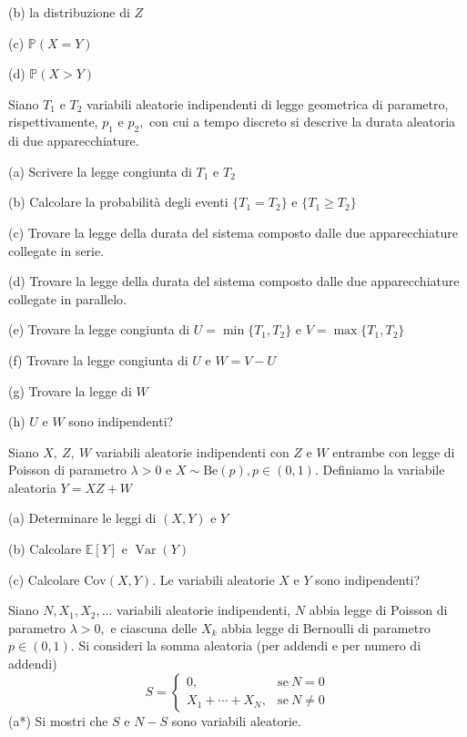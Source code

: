 (b) la distribuzione di $Z$

(c) $\mathbb{P} (X=Y)$

(d) $\mathbb{P} (X >Y)$
\Esercizio{}

Siano $T_{1}$ e $T_{2}$ variabili aleatorie indipendenti di legge geometrica di parametro, rispettivamente, $p_{1}$ e $p_{2} ,$ con cui a tempo discreto si descrive la durata aleatoria di due apparecchiature.

(a) Scrivere la legge congiunta di $T_{1}$ e $T_{2}$

(b) Calcolare la probabilità degli eventi $\{T_{1} =T_{2}\}$ e $\{T_{1} \geq T_{2}\}$

(c) Trovare la legge della durata del sistema composto dalle due apparecchiature collegate in serie.

(d) Trovare la legge della durata del sistema composto dalle due apparecchiature collegate in parallelo.

(e) Trovare la legge congiunta di $U=\min\{T_{1} ,T_{2}\}$ e $V=\max\{T_{1} ,T_{2}\}$

(f) Trovare la legge congiunta di $U$ e $W=V-U$

(g) Trovare la legge di $W$

(h) $U$ e $W$ sono indipendenti?
\Esercizio{}

Siano $X,\ Z,\ W$ variabili aleatorie indipendenti con $Z$ e $W$ entrambe con legge di Poisson di parametro $\lambda  >0$ e $X\sim \mathrm{Be} (p),p\in (0,1)$. Definiamo la variabile aleatoria $Y=XZ+W$

(a) Determinare le leggi di $(X,Y)$ e $Y$

(b) Calcolare $\mathbb{E} [Y]$ e $\operatorname{Var} (Y)$

(c) Calcolare $\mathrm{Cov} (X,Y)$. Le variabili aleatorie $X$ e $Y$ sono indipendenti?
\Esercizio{}

Siano $N,X_{1} ,X_{2} ,\dotsc $ variabili aleatorie indipendenti, $N$ abbia legge di Poisson di parametro $\lambda  >0,$ e ciascuna delle $X_{k}$ abbia legge di Bernoulli di parametro $p\in (0,1).$ Si consideri la somma aleatoria (per addendi e per numero di addendi)
\begin{equation*}
S=\begin{cases}
0, & \text{se} \ N=0\\
X_{1} +\cdots +X_{N} , & \text{se} \ N\neq 0
\end{cases}
\end{equation*}
(a*) Si mostri che $S$ e $N-S$ sono variabili aleatorie.

